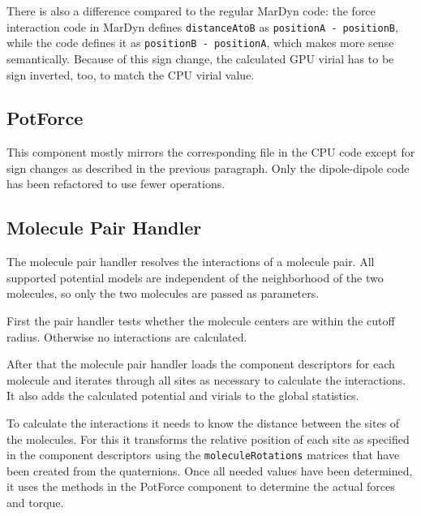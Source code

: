 There is also a difference compared to the regular MarDyn code: the force interaction code in MarDyn defines \lstinline!distanceAtoB! as \lstinline!positionA - positionB!, while the \cuda{} code defines it as \lstinline!positionB - positionA!, which makes more sense semantically. Because of this sign change, the calculated GPU virial has to be sign inverted, too, to match the CPU virial value.

\subsection{PotForce}
This component mostly mirrors the corresponding  file in the CPU code except for sign changes as described in the previous paragraph. Only the dipole-dipole code has been refactored to use fewer operations.

\subsection{Molecule Pair Handler}
The molecule pair handler resolves the interactions of a molecule pair. All supported potential models are independent of the neighborhood of the two molecules, so only the two molecules are passed as parameters.

First the pair handler tests whether the molecule centers are within the cutoff radius. Otherwise no interactions are calculated.

After that the molecule pair handler loads the component descriptors for each molecule and iterates through all sites as necessary to calculate the interactions. It also adds the calculated potential and virials to the global statistics.

To calculate the interactions it needs to know the distance between the sites of the molecules. For this it transforms the relative position of each site as specified in the component descriptors using the \lstinline!moleculeRotations! matrices that have been created from the quaternions. Once all needed values have been determined, it uses the methods in the PotForce component to determine the actual forces and torque.

